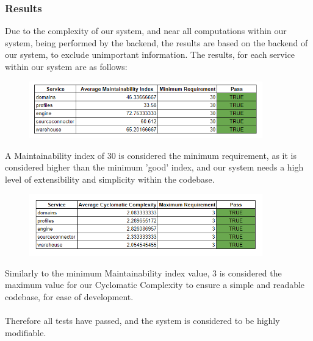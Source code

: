 \documentclass[12pt]{article}
\begin{document}
\subsubsection{Results}
Due to the complexity of our system, and near all computations within our system, being performed by the backend, the results are based on the backend of our system, to exclude unimportant information.
The results, for each service within our system are as follows:
\begin{figure}[H]
    \centering
    \includegraphics[width=0.9\textwidth]{Maintainability.png}
\end{figure}
A Maintainability index of 30 is considered the minimum requirement, as it is considered higher than the minimum 'good' index, and our system needs a high level of extensibility and simplicity within the codebase.
\begin{figure}[H]
    \centering
    \includegraphics[width=0.9\textwidth]{Cyclomatic.png}
\end{figure}
Similarly to the minimum Maintainability index value, 3 is considered the maximum value for our Cyclomatic Complexity to ensure a simple and readable codebase, for ease of development.
\\\\Therefore all tests have passed, and the system is considered to be highly modifiable.
\newpage
\end{document}
